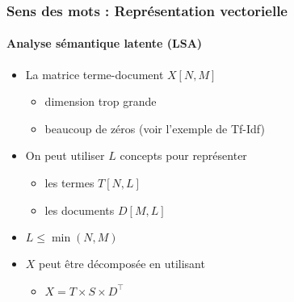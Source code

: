 \documentclass[xcolor=table]{beamer}
\begin{document}
\begin{frame}
\frametitle{Sens des mots : Représentation vectorielle}
\framesubtitle{Analyse sémantique latente (LSA)}

\begin{itemize}
	\item La matrice terme-document $X[N, M]$ 
	\begin{itemize}
		\item dimension trop grande
		\item beaucoup de zéros (voir l'exemple de Tf-Idf)
	\end{itemize}
	\item On peut utiliser $L$ concepts pour représenter
	\begin{itemize}
		\item les termes $T[N, L]$
		\item les documents $D[M, L]$
	\end{itemize}
	\item $L \le \min(N, M)$
	\item $X$ peut être décomposée en utilisant 
	\begin{itemize}
		\item $X = T \times S \times D^\top$
	\end{itemize}
\end{itemize}

\end{frame}
\end{document}
